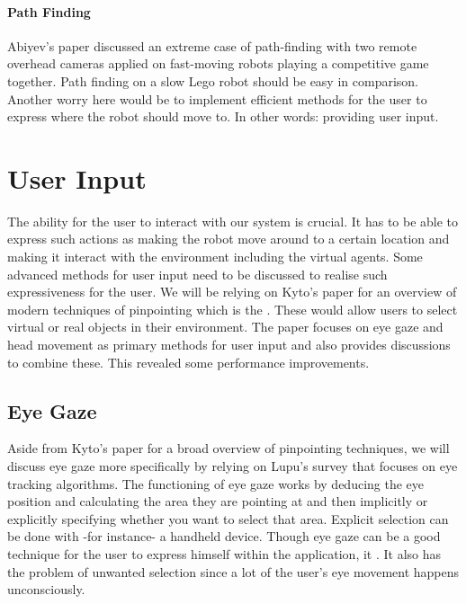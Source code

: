 
\paragraph{Path Finding}
Abiyev's paper\cite{abiyev2015improved} discussed an extreme case of path-finding with two remote overhead cameras applied on fast-moving robots playing a competitive game together. Path finding on a slow Lego robot should be easy in comparison. Another worry here would be to implement efficient methods for the user to express where the robot should move to. In other words: providing user input. 

\section{User Input}
The ability for the user to interact with our system is crucial. It has to be able to express such actions as making the robot move around to a certain location and making it interact with the environment including the virtual agents. Some advanced methods for user input need to be discussed to realise such expressiveness for the user. 
We will be relying on Kyto's paper\cite{kyto2018pinpointing} for an overview of modern techniques of pinpointing which is the . These would allow users to select virtual or real objects in their environment. The paper focuses on eye gaze and head movement as primary methods for user input and also provides discussions to combine these. This revealed some performance improvements. 

\subsection{Eye Gaze}
Aside from Kyto's paper\cite{kyto2018pinpointing} for a broad overview of pinpointing techniques, we will discuss eye gaze more specifically by relying on Lupu's survey\cite{lupu2013survey} that focuses on eye tracking algorithms.\newline
The functioning of eye gaze works by deducing the eye position and calculating the area they are pointing at and then implicitly or explicitly specifying whether you want to select that area. Explicit selection can be done with -for instance- a handheld device. Though eye gaze can be a good technique for the user to express himself within the application, it \cite{kyto2018pinpointing}. It also has the problem of unwanted selection since a lot of the user's eye movement happens unconsciously. 

